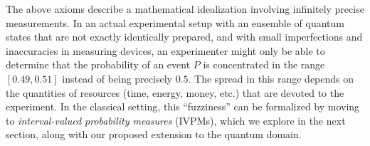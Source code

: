 \documentclass[english,reprint, aps, prl,superscriptaddress, showpacs,
showkeys, longbibliography, amsmath, amssymb, floatfix]{revtex4-1}
\theoremstyle{plain}
\theoremstyle{definition}
\newcommand{\proj}[1]{\op{#1}{#1}}
\newcommand{\ps}{\texttt{+}}
\newcommand{\rmi}{\mathrm{i}}
\begin{document}
\begin{comment}
As an example, consider a three-dimensional Hilbert space with orthonormal
basis $\{\ket{0},\ket{1},\ket{2}\}$ and an observable $\mathbf{O}$
with spectral decomposition $\mathbf{O}=\proj{0}+2\,\proj{1}+3\,\proj{2}$,
i.e., $\lambda_{i}=i$ and $P_{i}=\proj{i-1}$. Two fragments of valid
probability measures~$\mu_{1}$ and $\mu_{2}$ that can be associated
with this space are defined in Table~\ref{tab:quantum-probability-measure}.
\begin{table}
\noindent \centering{}\caption{\label{tab:quantum-probability-measure}Two fragments of valid probability
measures~$\mu_{1}$ and $\mu_{2}$.}
\begin{tabular}{ccc}
\toprule 
\addlinespace
$\ket{\psi}$ & $\mu_{1}(\proj{\psi})$ & $\mu_{2}(\proj{\psi})$\tabularnewline\addlinespace
\midrule
\midrule 
\addlinespace
$\ket{0}$ & $\frac{1}{2}$ & $\frac{1}{2}$\tabularnewline\addlinespace
\midrule 
\addlinespace
$\ket{1}$ & $\frac{1}{2}$ & $0$\tabularnewline\addlinespace
\midrule 
\addlinespace
$\ket{2}$ & $0$ & $\frac{1}{2}$\tabularnewline\addlinespace
\midrule 
\addlinespace
$\ket{\ps}=\frac{\ket{0}+\ket{1}}{\sqrt{2}}$ & $1$ & $\frac{1}{4}$\tabularnewline\addlinespace
\midrule 
\addlinespace
$\ket{\rmi}=\frac{\ket{0}+\rmi\ket{1}}{\sqrt{2}}$ & $\frac{1}{2}$ & $\frac{1}{4}$\tabularnewline\addlinespace
\midrule 
\addlinespace
$\ket{\ps'}=\frac{\ket{0}+\ket{2}}{\sqrt{2}}$ & $\frac{1}{4}$ & $\frac{1}{2}$\tabularnewline\addlinespace
\midrule 
\addlinespace
$\ket{\rmi'}=\frac{\ket{0}+\rmi\ket{2}}{\sqrt{2}}$ & $\frac{1}{4}$ & $\frac{1}{2}$\tabularnewline\addlinespace
\midrule 
\addlinespace
$\ket{\ps''}=\frac{\ket{1}+\ket{2}}{\sqrt{2}}$ & $\frac{1}{4}$ & $\frac{1}{4}$\tabularnewline\addlinespace
\midrule 
\addlinespace
$\ket{\rmi''}=\frac{\ket{1}+\rmi\ket{2}}{\sqrt{2}}$ & $\frac{1}{4}$ & $\frac{1}{4}$\tabularnewline\addlinespace
\bottomrule
\end{tabular}
\end{table}
By the Born rule, the first probability measure corresponds to the
quantum system being in the pure state $\ket{\ps}=(\ket{0}+\ket{1})/\sqrt{2}$
and the second corresponds to the quantum system being in the state
$\rho=(\proj{0}+\proj{2})/2$. The expectation values of the observable
$\mathbf{O}$, $\expval{\mathbf{O}}_{\mu_{1,2}}$, are 1.5 in the
first case and 2 in the second.
\end{comment}

The above axioms describe a mathematical idealization involving
infinitely precise measurements. In an actual experimental setup with
an ensemble of quantum states that are not exactly identically
prepared, and with small imperfections and inaccuracies in measuring
devices, an experimenter might only be able to determine that the
probability of an event $P$ is concentrated in the range $[0.49,0.51]$
instead of being precisely $0.5$. The spread in this range depends on
the quantities of resources (time, energy, money, etc.) that are
devoted to the experiment. In the classical setting, this
``fuzziness'' can be formalized by moving to \emph{interval-valued
  probability measures} (IVPMs), which we explore in the next section,
along with our proposed extension to the quantum domain.
\end{document}
